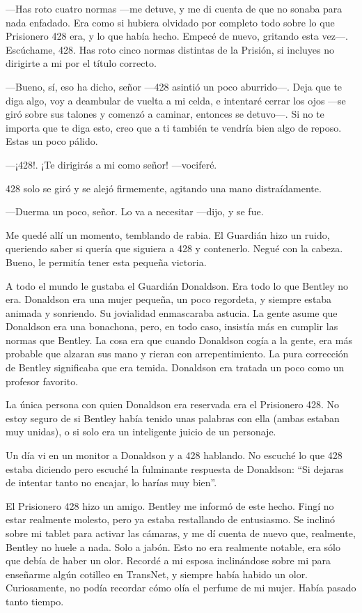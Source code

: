 ---Has roto cuatro normas ---me detuve, y me di cuenta de que no sonaba
para nada enfadado. Era como si hubiera olvidado por completo todo sobre
lo que Prisionero 428 era, y lo que había hecho. Empecé de nuevo,
gritando esta vez---. Escúchame, 428. Has roto cinco normas distintas de
la Prisión, si incluyes no dirigirte a mi por el título correcto.

---Bueno, sí, eso ha dicho, señor ---428 asintió un poco aburrido---.
Deja que te diga algo, voy a deambular de vuelta a mi celda, e intentaré
cerrar los ojos ---se giró sobre sus talones y comenzó a caminar,
entonces se detuvo---. Si no te importa que te diga esto, creo que a ti
también te vendría bien algo de reposo. Estas un poco pálido.

---¡428!. ¡Te dirigirás a mi como señor! ---vociferé.

428 solo se giró y se alejó firmemente, agitando una mano
distraídamente.

---Duerma un poco, señor. Lo va a necesitar ---dijo, y se fue.

Me quedé allí un momento, temblando de rabia. El Guardián hizo un ruido,
queriendo saber si quería que siguiera a 428 y contenerlo. Negué con la
cabeza. Bueno, le permitía tener esta pequeña victoria.

A todo el mundo le gustaba el Guardián Donaldson. Era todo lo que
Bentley no era. Donaldson era una mujer pequeña, un poco regordeta, y
siempre estaba animada y sonriendo. Su jovialidad enmascaraba astucia.
La gente asume que Donaldson era una bonachona, pero, en todo caso,
insistía más en cumplir las normas que Bentley. La cosa era que cuando
Donaldson cogía a la gente, era más probable que alzaran sus mano y
rieran con arrepentimiento. La pura corrección de Bentley significaba
que era temida. Donaldson era tratada un poco como un profesor favorito.

La única persona con quien Donaldson era reservada era el Prisionero
428. No estoy seguro de si Bentley había tenido unas palabras con ella
(ambas estaban muy unidas), o si solo era un inteligente juicio de un
personaje.

Un día vi en un monitor a Donaldson y a 428 hablando. No escuché lo que
428 estaba diciendo pero escuché la fulminante respuesta de Donaldson:
``Si dejaras de intentar tanto no encajar, lo harías muy bien''.

El Prisionero 428 hizo un amigo. Bentley me informó de este hecho. Fingí
no estar realmente molesto, pero ya estaba restallando de entusiasmo. Se
inclinó sobre mi tablet para activar las cámaras, y me dí cuenta de
nuevo que, realmente, Bentley no huele a nada. Solo a jabón. Esto no era
realmente notable, era sólo que debía de haber un olor. Recordé a mi
esposa inclinándose sobre mi para enseñarme algún cotilleo en TransNet,
y siempre había habido un olor. Curiosamente, no podía recordar cómo
olía el perfume de mi mujer. Había pasado tanto tiempo.

